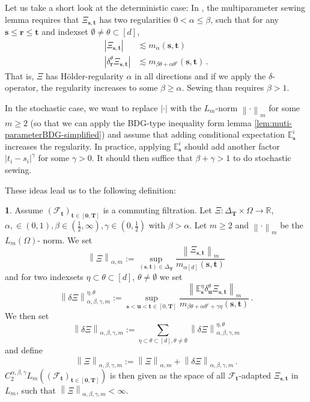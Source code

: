 \documentclass[11pt,oneside,english,reqno]{amsart}
\numberwithin{equation}{section}
\numberwithin{figure}{section}
\theoremstyle{plain}
\theoremstyle{definition}
\newtheorem{defn}[thm]{\protect\definitionname}
\theoremstyle{remark}
\theoremstyle{plain}
\theoremstyle{plain}
\theoremstyle{plain}
\theoremstyle{plain}
\theoremstyle{plain}
\providecommand{\definitionname}{Definition}
\newcommand{\cF}{\mathcal{F}}
\newcommand{\EE}{\mathbb{E}}
\newcommand{\RR}{\mathbb{R}}
\newcommand{\br}{\mathbf{r}}
\newcommand{\bT}{\mathbf{T}}
\newcommand{\boo}{\mathbf{0}}
\newcommand{\bu}{\mathbf{u}}
\newcommand{\bs}{\mathbf{s}}
\newcommand{\bt}{\mathbf{t}}
\newcommand{\norm}[1]{\left\lVert #1\right\rVert}
\newcommand{\abs}[1]{\left\lvert #1\right\rvert}
\begin{document}
Let us take a short look at the deterministic case: In \cite{Harang2021}, the multiparameter sewing lemma requires that $\Xi_{\bs,\bt}$ has two regularities $0<\alpha\le\beta$, such that for any $\bs\le\br\le\bt$ and indexset $\emptyset\neq\theta\subset[d]$,
%
\begin{align*}
    \abs{\Xi_{\bs,\bt}}&\lesssim m_{\alpha}(\bs,\bt)\\
    \abs{\delta^\theta_\br\Xi_{\bs,\bt}} &\lesssim m_{\beta\theta+\alpha\theta^c}(\bs,\bt)\,.
\end{align*}
%
That is, $\Xi$ has Hölder-regularity $\alpha$ in all directions and if we apply the $\delta$-operator, the regularity increases to some $\beta\ge\alpha$. Sewing than requires $\beta>1$.

In the stochastic case, we want to replace $\abs\cdot$ with the $L_m$-norm $\norm{\cdot}_m$ for some $m\ge 2$ (so that we can apply the BDG-type inequality form lemma \ref{lem:muti-parameterBDG-simplified}) and assume that adding conditional expectation $\EE^i_\bs$ increases the regularity. In practice, applying $\EE^i_\bs$ should add another factor $\abs{t_i-s_i}^\gamma$ for some $\gamma>0$. It should then suffice that $\beta+\gamma>1$ to do stochastic sewing.

These ideas lead us to the following definition:

\begin{defn}
Assume $(\cF_\bt)_{\bt\in[\boo,\bT]}$ is a commuting filtration. Let $\Xi:\Delta_\bT\times\Omega\to\RR$, $\alpha,\in(0,1),\beta\in(\frac 12,\infty),\gamma\in(0,\frac 12)$ with $\beta>\alpha$. Let $m\ge 2$ and $\norm{\cdot}_m$ be the $L_m(\Omega)$- norm. We set
%
\begin{equation*}
    \norm{\Xi}_{\alpha,m} := \sup_{(\bs,\bt)\in\Delta_\bT} \frac{\norm{\Xi_{\bs,\bt}}_m}{m_{\alpha[d]}(\bs,\bt)}
\end{equation*}
%
and for two indexsets $\eta\subset\theta\subset[d]$, $\theta\neq\emptyset$ we set
%
\begin{equation*}
    \norm{\delta\Xi}_{\alpha,\beta,\gamma,m}^{\eta,\theta} := \sup_{\bs<\bu<\bt\in[0,\bT]} \frac{\norm{\EE^\eta_\bs\delta^\theta_\bu\Xi_{\bs,\bt}}_m}{m_{\beta\theta+\alpha\theta^c+\gamma\eta}(\bs,\bt)}\,.
\end{equation*}
%
We then set
%
\begin{equation*}
    \norm{\delta\Xi}_{\alpha,\beta,\gamma,m} := \sum_{\eta\subset\theta\subset[d],\theta\neq\emptyset} \norm{\delta\Xi}_{\alpha,\beta,\gamma,m}^{\eta,\theta}
\end{equation*}
%
and define
%
\begin{equation*}
    \norm{\Xi}_{\alpha,\beta,\gamma,m} := \norm{\Xi}_{\alpha,m} +\norm{\delta\Xi}_{\alpha,\beta,\gamma,m}\,.
\end{equation*}
%
$C^{\alpha,\beta,\gamma}_2 L_m((\cF_\bt)_{\bt\in[\boo,\bT]})$ is then given as the space of all $\cF_\bt$-adapted $\Xi_{\bs,\bt}$ in $L_m$, such that $\norm{\Xi}_{\alpha,\beta,\gamma,m} <\infty$.
\end{defn}
\end{document}
